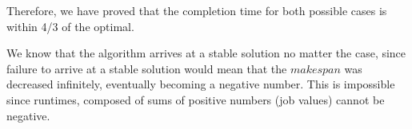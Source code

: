 \documentclass[11pt]{article}
\begin{document}
Therefore, we have proved that the completion time for both possible cases is within 4/3 of the optimal.

We know that the algorithm arrives at a stable solution no matter the case, since failure to arrive at a stable solution would mean that the $makespan$ was decreased infinitely, eventually becoming a negative number. This is impossible since runtimes, composed of sums of positive numbers (job values) cannot be negative.
\end{document}
